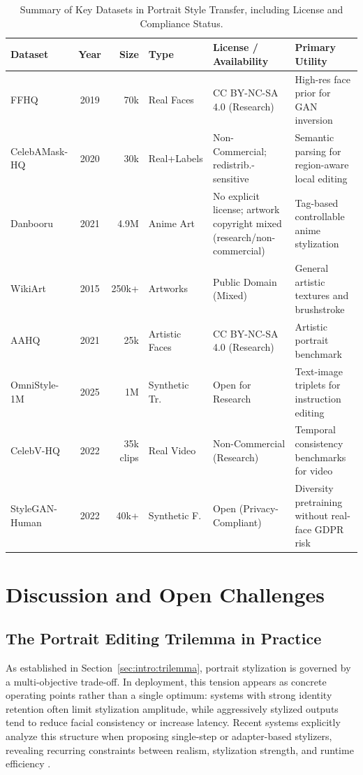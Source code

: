 \documentclass[journal]{IEEEtran}
\begin{document}
\begin{table}[t]
\centering
\caption{Summary of Key Datasets in Portrait Style Transfer, including License and Compliance Status.}
\label{tab:datasets_pst}
\begin{tabularx}{\textwidth}{lcrlp{2.8cm}p{3.2cm}}
\toprule
\textbf{Dataset} & \textbf{Year} & \textbf{Size} & \textbf{Type} & \textbf{License / Availability} & \textbf{Primary Utility} \\
\midrule
FFHQ \cite{karras2019style} & 2019 & 70k & Real Faces & CC BY-NC-SA 4.0 (Research) & High-res face prior for GAN inversion \\
CelebAMask-HQ \cite{lee2020} & 2020 & 30k & Real+Labels & Non-Commercial; redistrib.-sensitive & Semantic parsing for region-aware local editing \\
Danbooru \cite{danbooru2021} & 2021 & 4.9M & Anime Art & No explicit license; artwork copyright mixed (research/non-commercial) & Tag-based controllable anime stylization \\
WikiArt \cite{wikiart} & 2015 & 250k+ & Artworks & Public Domain (Mixed) & General artistic textures and brushstroke \\
AAHQ \cite{liu2021blendgan} & 2021 & 25k & Artistic Faces & CC BY-NC-SA 4.0 (Research) & Artistic portrait benchmark \\
OmniStyle-1M \cite{wang2025omnistyle} & 2025 & 1M & Synthetic Tr. & Open for Research & Text-image triplets for instruction editing \\
CelebV-HQ \cite{celebvhq} & 2022 & 35k clips & Real Video & Non-Commercial (Research) & Temporal consistency benchmarks for video \\
StyleGAN-Human \cite{stylegan-human} & 2022 & 40k+ & Synthetic F. & Open (Privacy-Compliant) & Diversity pretraining without real-face GDPR risk \\
\bottomrule
\end{tabularx}
\end{table}

\section{Discussion and Open Challenges}
\label{sec:discussion}
\subsection{The Portrait Editing Trilemma in Practice}
\label{sec:discussion:triangle}
As established in Section~\ref{sec:intro:trilemma}, portrait stylization is governed by a multi-objective trade-off. In deployment, this tension appears as concrete operating points rather than a single optimum: systems with strong identity retention often limit stylization amplitude, while aggressively stylized outputs tend to reduce facial consistency or increase latency.
Recent systems explicitly analyze this structure when proposing single-step or adapter-based stylizers, revealing recurring constraints between realism, stylization strength, and runtime efficiency \cite{wang2025instantstyleplus,zhang2023prospectps}.
\end{document}
